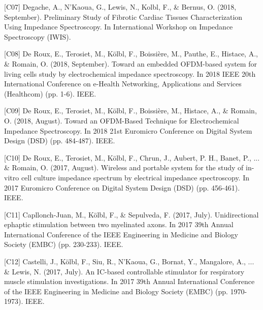 \begin{cvskills}    
  \cvskill
    {[C07]} %
    {Degache, A., N'Kaoua, G., Lewis, N., Kolbl, F., \& Bernus, O. (2018, September). Preliminary Study of Fibrotic Cardiac Tissues Characterization Using Impedance Spectroscopy. In International Workshop on Impedance Spectroscopy (IWIS).} %
\end{cvskills}  
\begin{cvskills}    
  \cvskill
    {[C08]} %
    {De Roux, E., Terosiet, M., Kölbl, F., Boissière, M., Pauthe, E., Histace, A., \& Romain, O. (2018, September). Toward an embedded OFDM-based system for living cells study by electrochemical impedance spectroscopy. In 2018 IEEE 20th International Conference on e-Health Networking, Applications and Services (Healthcom) (pp. 1-6). IEEE.} %
\end{cvskills}  
\begin{cvskills}    
  \cvskill
    {[C09]} %
    {De Roux, E., Terosiet, M., Kölbl, F., Boissière, M., Histace, A., \& Romain, O. (2018, August). Toward an OFDM-Based Technique for Electrochemical Impedance Spectroscopy. In 2018 21st Euromicro Conference on Digital System Design (DSD) (pp. 484-487). IEEE.} %
\end{cvskills}  
\begin{cvskills}    
  \cvskill
    {[C10]} %
    {De Roux, E., Terosiet, M., Kölbl, F., Chrun, J., Aubert, P. H., Banet, P., ... \& Romain, O. (2017, August). Wireless and portable system for the study of in-vitro cell culture impedance spectrum by electrical impedance spectroscopy. In 2017 Euromicro Conference on Digital System Design (DSD) (pp. 456-461). IEEE.} %
\end{cvskills}  
\begin{cvskills}    
  \cvskill
    {[C11]} %
    {Capllonch-Juan, M., Kölbl, F., \& Sepulveda, F. (2017, July). Unidirectional ephaptic stimulation between two myelinated axons. In 2017 39th Annual International Conference of the IEEE Engineering in Medicine and Biology Society (EMBC) (pp. 230-233). IEEE.} %
\end{cvskills}  
\begin{cvskills}    
  \cvskill
    {[C12]} %
    {Castelli, J., Kölbl, F., Siu, R., N'Kaoua, G., Bornat, Y., Mangalore, A., ... \& Lewis, N. (2017, July). An IC-based controllable stimulator for respiratory muscle stimulation investigations. In 2017 39th Annual International Conference of the IEEE Engineering in Medicine and Biology Society (EMBC) (pp. 1970-1973). IEEE.} %
\end{cvskills}  
